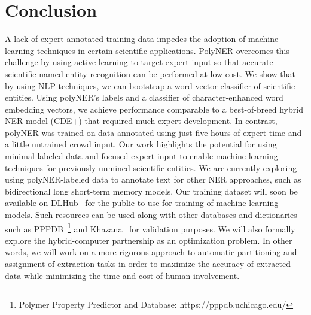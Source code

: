 \section{Conclusion}
\label{sect:apner_conclusion}
A lack of expert-annotated training data impedes the adoption of machine learning techniques in certain scientific applications.
PolyNER overcomes this challenge by 
using active learning to target 
expert input so that accurate scientific named entity recognition can be performed at low cost.
We show that by using NLP techniques, we can bootstrap a word vector classifier of scientific entities.
Using polyNER's labels and a classifier of character-enhanced word embedding vectors, we achieve 
performance comparable to a best-of-breed
hybrid NER model (CDE+) that required much expert development.
In contrast, polyNER was trained on data annotated using just five hours of expert time and a little untrained crowd input.
Our work highlights the potential for using minimal labeled data %
and focused expert input to enable machine learning techniques for previously unmined scientific entities. 
We are currently exploring using polyNER-labeled data to annotate text for other NER approaches,
such as bidirectional long short-term memory models. 
Our training dataset will soon be available on DLHub~\cite{chard2018dlhub} for the public to use for training of machine learning models.
Such resources can be used along with other databases and dictionaries such as PPPDB~\footnote{Polymer Property Predictor and Database: https://pppdb.uchicago.edu/} and Khazana~\cite{huan2016polymer} for validation purposes. 
We will also formally explore the hybrid-computer partnership as an optimization problem.
In other words, we will work on a more
rigorous approach to automatic partitioning and assignment of extraction tasks in order to maximize the accuracy of extracted data while minimizing the time and cost of human involvement.

